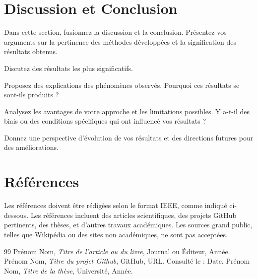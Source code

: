 \documentclass[conference]{IEEEtran}
\begin{document}
\section{Discussion et Conclusion}
Dans cette section, fusionnez la discussion et la conclusion. Présentez vos arguments sur la pertinence des méthodes développées et la signification des résultats obtenus.

Discutez des résultats les plus significatifs.

Proposez des explications des phénomènes observés. Pourquoi ces résultats se sont-ils produits ?


Analysez les avantages de votre approche et les limitations possibles. Y a-t-il des biais ou des conditions spécifiques qui ont influencé vos résultats ?

Donnez une perspective d’évolution de vos résultats et des directions futures pour des améliorations.

\section*{Références}
Les références doivent être rédigées selon le format IEEE, comme indiqué ci-dessous. Les références incluent des articles scientifiques, des projets GitHub pertinents, des thèses, et d'autres travaux académiques. Les sources grand public, telles que Wikipédia ou des sites non académiques, ne sont pas acceptées.

\begin{thebibliography}{99}
 Prénom Nom, \textit{Titre de l'article ou du livre}, Journal ou Éditeur, Année.
 Prénom Nom, \textit{Titre du projet Github}, GitHub, URL. Consulté le : Date.
 Prénom Nom, \textit{Titre de la thèse}, Université, Année.
\end{thebibliography}
\end{document}
